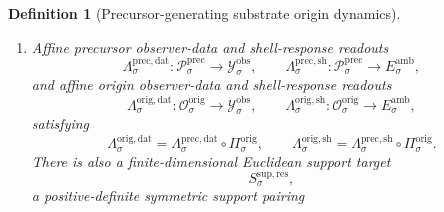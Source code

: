\documentclass[11pt]{article}
\newcommand{\DataSpace}[1]{\mathcal Y_{#1}^{\mathrm{obs}}}
\newcommand{\AmbientTarget}[1]{E_{#1}^{\mathrm{amb}}}
\newcommand{\ResTarget}[1]{S_{#1}^{\mathrm{sup,res}}}
\newcommand{\SubBody}[1]{\mathcal B_{#1}^{\mathrm{sub}}}
\newcommand{\LiftBody}[1]{\mathcal B_{#1}^{\mathrm{lift}}}
\newcommand{\LiftProj}[1]{\Pi_{#1}^{\mathrm{lift}}}
\newcommand{\LiftSelect}[1]{\mathfrak s_{#1}^{\mathrm{lift}}}
\newcommand{\LiftFunctional}[1]{\mathscr V_{#1}^{\mathrm{lift}}}
\newcommand{\PrecSpace}[1]{\mathcal P_{#1}^{\mathrm{prec}}}
\newcommand{\PrecBody}[1]{\mathcal B_{#1}^{\mathrm{prec}}}
\newcommand{\PrecProj}[1]{\Pi_{#1}^{\mathrm{prec}}}
\newcommand{\PrecLiftMin}[1]{\mathfrak f_{#1}^{\mathrm{prec}}}
\newcommand{\PrecSubMin}[1]{\mathfrak m_{#1}^{\mathrm{prec}}}
\newcommand{\PrecFunctional}[1]{\mathscr W_{#1}^{\mathrm{prec}}}
\newcommand{\PrecData}[1]{\Lambda_{#1}^{\mathrm{prec,dat}}}
\newcommand{\PrecShellMap}[1]{\Lambda_{#1}^{\mathrm{prec,sh}}}
\newcommand{\OrigSpace}[1]{\mathcal O_{#1}^{\mathrm{orig}}}
\newcommand{\OrigProj}[1]{\Pi_{#1}^{\mathrm{orig}}}
\newcommand{\OrigData}[1]{\Lambda_{#1}^{\mathrm{orig,dat}}}
\newcommand{\OrigShellMap}[1]{\Lambda_{#1}^{\mathrm{orig,sh}}}
\newcommand{\OrigShellSet}[1]{\mathcal Z_{#1}^{\mathrm{orig}}}
\newtheorem{definition}{Definition}
\begin{document}
\begin{definition}[Precursor-generating substrate origin dynamics]
\begin{enumerate}
    Assume that \(\PrecLiftMin{\sigma}(\ell)\) is therefore the unique minimizer of \(\PrecFunctional{\sigma}\) on the fiber
    \[
    \bigl(\PrecProj{\sigma}\bigr)^{-1}(\ell)\cap\PrecBody{\sigma},
    \]
    that \(\PrecSubMin{\sigma}(m)\) is therefore the unique minimizer of \(\PrecFunctional{\sigma}\) on the composite fiber
    \[
    \bigl(\LiftProj{\sigma}\circ\PrecProj{\sigma}\bigr)^{-1}(m)\cap\PrecBody{\sigma},
    \]
    and that \(\LiftSelect{\sigma}(m)\) is therefore the unique minimizer of \(\LiftFunctional{\sigma}\) on
    \[
    \bigl(\LiftProj{\sigma}\bigr)^{-1}(m)\cap\LiftBody{\sigma}.
    \]
    Assume there exists \(\mu_{\sigma}^{\mathrm{fib}}>0\) such that
    \begin{equation}
    \LiftFunctional{\sigma}(\ell)
    \ge
    \LiftFunctional{\sigma}\bigl(\LiftSelect{\sigma}(m)\bigr)
    +
    \mu_{\sigma}^{\mathrm{fib}}\,
    \operatorname{dist}\bigl(\ell,\LiftSelect{\sigma}(m)\bigr)^{2}
    \label{eq:origprecfibergap}
    \end{equation}
    for every \(m\in\SubBody{\sigma}\) and every \(\ell\in\bigl(\LiftProj{\sigma}\bigr)^{-1}(m)\cap\LiftBody{\sigma}\). Assume there exists \(\mu_{\sigma}^{\mathrm{sub}}>0\) such that
    \begin{equation}
    \LiftFunctional{\sigma}\bigl(\LiftSelect{\sigma}(m)\bigr)
    \ge
    \mu_{\sigma}^{\mathrm{sub}}\,
    \operatorname{dist}\bigl(m,\LiftProj{\sigma}(\PrecProj{\sigma}(\OrigProj{\sigma}(\OrigShellSet{\sigma})))\bigr)^{2}
    \qquad
    \text{for all }m\in\SubBody{\sigma}.
    \label{eq:origprecprojectedgap}
    \end{equation}
    \item Affine precursor observer-data and shell-response readouts
    \[
    \PrecData{\sigma}:\PrecSpace{\sigma}\to\DataSpace{\sigma},
    \qquad
    \PrecShellMap{\sigma}:\PrecSpace{\sigma}\to\AmbientTarget{\sigma},
    \]
    and affine origin observer-data and shell-response readouts
    \[
    \OrigData{\sigma}:\OrigSpace{\sigma}\to\DataSpace{\sigma},
    \qquad
    \OrigShellMap{\sigma}:\OrigSpace{\sigma}\to\AmbientTarget{\sigma},
    \]
    satisfying
    \begin{equation}
    \OrigData{\sigma}
    =
    \PrecData{\sigma}\circ\OrigProj{\sigma},
    \qquad
    \OrigShellMap{\sigma}
    =
    \PrecShellMap{\sigma}\circ\OrigProj{\sigma}.
    \label{eq:origfactor}
    \end{equation}
    There is also a finite-dimensional Euclidean support target
    \[
    \ResTarget{\sigma},
    \]
    a positive-definite symmetric support pairing

\end{enumerate}
\end{definition}
\end{document}
